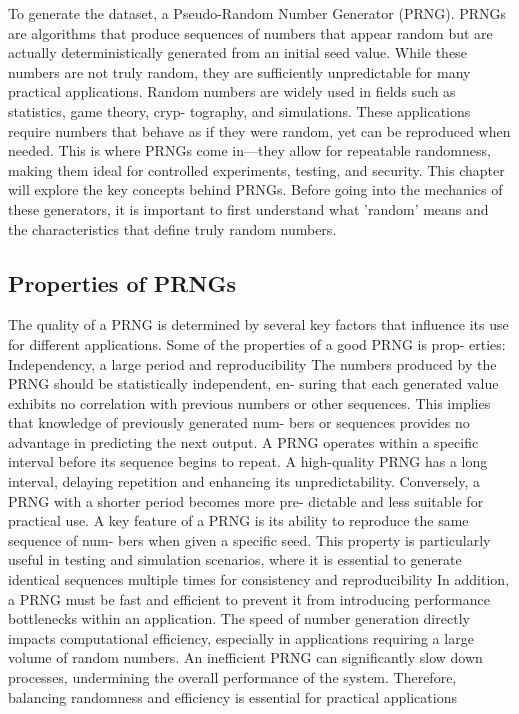 
	
	To generate the dataset, a Pseudo-Random Number Generator (PRNG).
	PRNGs are algorithms that produce sequences of numbers that appear random
	but are actually deterministically generated from an initial seed value. While
	these numbers are not truly random, they are sufficiently unpredictable for many
	practical applications.
	Random numbers are widely used in fields such as statistics, game theory, cryp-
	tography, and simulations. These applications require numbers that behave
	as if they were random, yet can be reproduced when needed. This is where
	PRNGs come in—they allow for repeatable randomness, making them ideal for
	controlled experiments, testing, and security.
	This chapter will explore the key concepts behind PRNGs. Before going into the
	mechanics of these generators, it is important to first understand what ’random’
	means and the characteristics that define truly random numbers.
	
	\subsection{Properties of PRNGs}
	
The quality of a PRNG is determined by several key factors that influence its
use for different applications. Some of the properties of a good PRNG is prop-
erties: Independency, a large period and reproducibility
The numbers produced by the PRNG should be statistically independent, en-
suring that each generated value exhibits no correlation with previous numbers
or other sequences. This implies that knowledge of previously generated num-
bers or sequences provides no advantage in predicting the next output.
A PRNG operates within a specific interval before its sequence begins to repeat.
A high-quality PRNG has a long interval, delaying repetition and enhancing its
unpredictability. Conversely, a PRNG with a shorter period becomes more pre-
dictable and less suitable for practical use.
A key feature of a PRNG is its ability to reproduce the same sequence of num-
bers when given a specific seed. This property is particularly useful in testing
and simulation scenarios, where it is essential to generate identical sequences
multiple times for consistency and reproducibility
In addition, a PRNG must be fast and efficient to prevent it from introducing
performance bottlenecks within an application. The speed of number generation
directly impacts computational efficiency, especially in applications requiring a
large volume of random numbers. An inefficient PRNG can significantly slow
down processes, undermining the overall performance of the system. Therefore,
balancing randomness and efficiency is essential for practical applications
	
